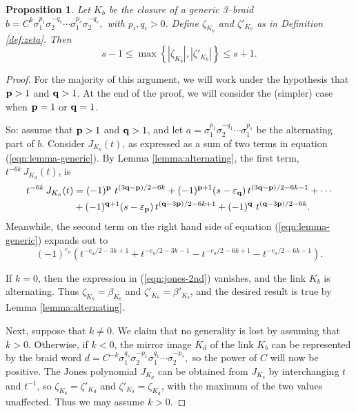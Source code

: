 \documentclass[11pt]{amsart}
\newcommand{\abs}[1]{{\left\vert #1 \right\vert}}
\newcommand{\p}{{\bf p}}
\newcommand{\q}{{\bf q}}
\newcommand{\ep}{\varepsilon_{\p}}
\newcommand{\eq}{\varepsilon_{\q}}
\theoremstyle{plain}
\newtheorem{prop}[theorem]{Proposition}
\theoremstyle{definition}
\begin{document}
\begin{prop}\label{prop:3-braids}
Let $K_b$ be the closure of a generic 3--braid
$b= C^k \sigma_1^{p_1} \sigma_2^{-q_1} \cdots \sigma_1^{p_s}
\sigma_2^{-q_s},$
%
with $p_i, q_i>0$.  Define $\zeta_{K_b}$ and $\zeta'_{K_b}$ as in Definition \ref{def:zeta}. Then
$$s-1 \leq  \max \left\{ \abs{\zeta_{K_b}}, \abs{\zeta'_{K_b}} \right\} \leq s+1.$$
\end{prop}


\begin{proof}
For the majority of this argument, we will work under the hypothesis that $\p >1$ and $\q >1$. 
At the end of the proof, we will consider the (simpler) case when $\p = 1$ or $\q = 1$.

So: assume that $\p >1$ and $\q >1$, and let $a = \sigma_1^{p_1} \sigma_2^{-q_1} \cdots \sigma_1^{p_s}$ be the alternating part of $b$. Consider $J_{K_b}(t)$, as expressed as a sum of two terms in equation
(\ref{eqn:lemma-generic}).  By Lemma \ref{lemma:alternating}, the
first term, $t^{-6k}\,J_{K_a}(t)$, is
\begin{eqnarray}
  t^{-6k} \, J_{{K_a}}(t) & = 
   (-1)^{{\bf p}} \ t^{(3\q-\p)/2-6k} +
   (-1)^{\p +1}(s- \eq) \, t^{(3\q-\p)/2-6k-1} + \cdots
		\label{eqn:jones-1st} %
 \\
  &  + (-1)^{\q +1}(s - \ep) \, t^{(\q-3\p)/2-6k+1} +
   (-1)^{{\bf q}} \ t^{(\q-3\p)/2-6k}. \notag
\end{eqnarray}
%
Meanwhile, the second term on the right hand
side of equation (\ref{eqn:lemma-generic}) expands out to
\begin{equation}
(-1)^{e_a} \left( t^{-e_a/2-3k +1} +
t^{-e_a/2-3k-1}- t^{-e_a/2-6k+1}-
t^{-e_a/2-6k-1}\right).
\label{eqn:jones-2nd} %
\end{equation}

If $k=0$, then the expression in (\ref{eqn:jones-2nd}) vanishes, and
the link $K_b$ is alternating. Thus  $\zeta_{K_b} = \beta_{K_b}$ and 
$\zeta'_{K_b} = \beta'_{K_b}$, and the desired result is true by
Lemma \ref{lemma:alternating}.

Next, suppose that $k \neq 0$. We claim that no generality is lost by assuming that $k > 0$. Otherwise, if $k < 0$, the mirror image $K_d$ of the link $K_b$ can be represented by the braid word $d = C^{-k} \sigma_1^{q_s} \sigma_2^{-p_1} \sigma_1^{q_1} \cdots \sigma_2^{-p_s} ,$ so the power of $C$ will now be positive. The Jones polynomial $J_{K_d}$ can be obtained from $J_{K_b}$ by interchanging $t$ and $t^{-1}$, so $\zeta_{K_b} = \zeta'_{K_d}$ and $\zeta'_{K_b} = \zeta_{K_d}$, with the maximum of the two values unaffected. Thus we may assume $k > 0$.


\end{proof}
\end{document}
